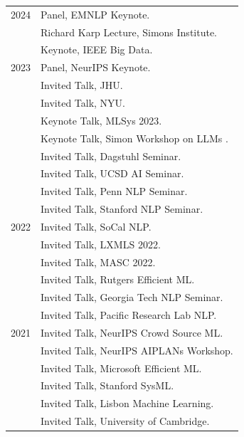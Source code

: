 \documentclass[10pt]{article}
\begin{document}
\medskip
\hspace{-1cm} \begin{tabular}{lp{11.5cm}}
	2024
	 & \ind   Panel, EMNLP Keynote.                         \\
	 & \ind   Richard Karp Lecture, Simons Institute.       \\
	 & \ind   Keynote, IEEE Big Data.                       \\
	2023
	 & \ind   Panel, NeurIPS Keynote.                       \\
	 & \ind   Invited Talk, JHU.                            \\
	 & \ind   Invited Talk, NYU.                            \\
	 & \ind   Keynote Talk, MLSys 2023.                     \\
	 & \ind   Keynote Talk, Simon Workshop on LLMs .        \\
	 & \ind   Invited Talk, Dagstuhl Seminar.               \\
	 & \ind   Invited Talk, UCSD AI Seminar.                \\
	 & \ind   Invited Talk, Penn NLP Seminar.               \\
	 & \ind   Invited Talk, Stanford NLP Seminar.           \\
	2022
	 & \ind   Invited Talk, SoCal NLP.                      \\
	 & \ind   Invited Talk, LXMLS 2022.                     \\
	 & \ind   Invited Talk, MASC 2022.                      \\
	 & \ind   Invited Talk, Rutgers Efficient ML.           \\
	 & \ind   Invited Talk, Georgia Tech NLP Seminar.       \\
	 & \ind   Invited Talk, Pacific Research Lab NLP.       \\
	2021
	 & \ind   Invited Talk, NeurIPS Crowd Source ML.        \\
	 & \ind   Invited Talk, NeurIPS AIPLANs Workshop.       \\
	 & \ind   Invited Talk, Microsoft Efficient ML.         \\
	 & \ind   Invited Talk, Stanford SysML.                 \\
	 & \ind   Invited Talk, Lisbon Machine Learning.        \\
	 & \ind   Invited Talk, University of Cambridge.        \\

\end{tabular}
\end{document}
